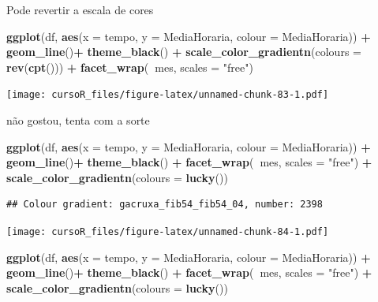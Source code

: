 \documentclass[]{book}
\newenvironment{Shaded}{\begin{snugshade}}{\end{snugshade}}
\newcommand{\KeywordTok}[1]{\textcolor[rgb]{0.13,0.29,0.53}{\textbf{#1}}}
\newcommand{\DataTypeTok}[1]{\textcolor[rgb]{0.13,0.29,0.53}{#1}}
\newcommand{\StringTok}[1]{\textcolor[rgb]{0.31,0.60,0.02}{#1}}
\newcommand{\OperatorTok}[1]{\textcolor[rgb]{0.81,0.36,0.00}{\textbf{#1}}}
\newcommand{\NormalTok}[1]{#1}
\begin{document}
Pode revertir a escala de cores

\begin{Shaded}
\begin{Highlighting}[]
\KeywordTok{ggplot}\NormalTok{(df, }\KeywordTok{aes}\NormalTok{(}\DataTypeTok{x =}\NormalTok{ tempo, }\DataTypeTok{y =}\NormalTok{ MediaHoraria, }\DataTypeTok{colour =}\NormalTok{ MediaHoraria)) }\OperatorTok{+}\StringTok{ }
\StringTok{  }\KeywordTok{geom_line}\NormalTok{()}\OperatorTok{+}
\StringTok{  }\KeywordTok{theme_black}\NormalTok{() }\OperatorTok{+}
\StringTok{  }\KeywordTok{scale_color_gradientn}\NormalTok{(}\DataTypeTok{colours =} \KeywordTok{rev}\NormalTok{(}\KeywordTok{cpt}\NormalTok{())) }\OperatorTok{+}\StringTok{ }
\StringTok{  }\KeywordTok{facet_wrap}\NormalTok{(}\OperatorTok{~}\NormalTok{mes, }\DataTypeTok{scales =} \StringTok{"free"}\NormalTok{)}
\end{Highlighting}
\end{Shaded}

\texttt{[image: cursoR\_files/figure-latex/unnamed-chunk-83-1.pdf]}

não gostou, tenta com a sorte

\begin{Shaded}
\begin{Highlighting}[]
\KeywordTok{ggplot}\NormalTok{(df, }\KeywordTok{aes}\NormalTok{(}\DataTypeTok{x =}\NormalTok{ tempo, }\DataTypeTok{y =}\NormalTok{ MediaHoraria, }\DataTypeTok{colour =}\NormalTok{ MediaHoraria)) }\OperatorTok{+}\StringTok{ }
\StringTok{  }\KeywordTok{geom_line}\NormalTok{()}\OperatorTok{+}
\StringTok{  }\KeywordTok{theme_black}\NormalTok{() }\OperatorTok{+}
\StringTok{    }\KeywordTok{facet_wrap}\NormalTok{(}\OperatorTok{~}\NormalTok{mes, }\DataTypeTok{scales =} \StringTok{"free"}\NormalTok{) }\OperatorTok{+}
\StringTok{  }\KeywordTok{scale_color_gradientn}\NormalTok{(}\DataTypeTok{colours =} \KeywordTok{lucky}\NormalTok{())}
\end{Highlighting}
\end{Shaded}

\begin{verbatim}
## Colour gradient: gacruxa_fib54_fib54_04, number: 2398
\end{verbatim}

\texttt{[image: cursoR\_files/figure-latex/unnamed-chunk-84-1.pdf]}

\begin{Shaded}
\begin{Highlighting}[]
\KeywordTok{ggplot}\NormalTok{(df, }\KeywordTok{aes}\NormalTok{(}\DataTypeTok{x =}\NormalTok{ tempo, }\DataTypeTok{y =}\NormalTok{ MediaHoraria, }\DataTypeTok{colour =}\NormalTok{ MediaHoraria)) }\OperatorTok{+}\StringTok{ }
\StringTok{  }\KeywordTok{geom_line}\NormalTok{()}\OperatorTok{+}
\StringTok{  }\KeywordTok{theme_black}\NormalTok{() }\OperatorTok{+}
\StringTok{    }\KeywordTok{facet_wrap}\NormalTok{(}\OperatorTok{~}\NormalTok{mes, }\DataTypeTok{scales =} \StringTok{"free"}\NormalTok{) }\OperatorTok{+}
\StringTok{  }\KeywordTok{scale_color_gradientn}\NormalTok{(}\DataTypeTok{colours =} \KeywordTok{lucky}\NormalTok{())}
\end{Highlighting}
\end{Shaded}
\end{document}
